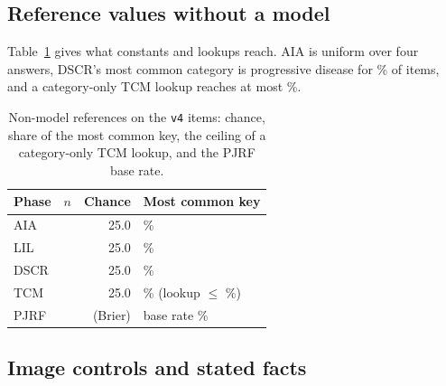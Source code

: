 \subsection{Reference values without a model}

Table~\ref{tab:baselines} gives what constants and lookups reach. AIA is uniform over four answers, DSCR's most common category is progressive disease for \vfourMajorityDSCR{}\% of items, and a category-only TCM lookup reaches at most \vfourTcmLookupConf{}\%.

\begin{table}[t]
\centering
\footnotesize
\setlength{\tabcolsep}{3pt}
\begin{tabular}{lrrl}
\toprule
Phase & $n$ & Chance & Most common key \\
\midrule
AIA & \vfourNAIA{} & 25.0 & \vfourMajorityAIA{}\% \\
LIL & \vfourNLIL{} & 25.0 & \vfourMajorityLIL{}\% \\
DSCR & \vfourNDSCR{} & 25.0 & \vfourMajorityDSCR{}\% \\
TCM & \vfourNTCM{} & 25.0 & \vfourMajorityTCM{}\% (lookup $\le$ \vfourTcmLookupConf{}\%) \\
PJRF & \vfourNPJRF{} & (Brier) & base rate \vfourPjrfBase{}\% \\
\bottomrule
\end{tabular}
\caption{Non-model references on the \texttt{v4} items: chance, share of the most common key, the ceiling of a category-only TCM lookup, and the PJRF base rate.}
\label{tab:baselines}
\end{table}

\subsection{Image controls and stated facts}

\ifnum{}
\fi

\begin{table}[t]
\centering
\footnotesize
\setlength{\tabcolsep}{3pt}

\caption{E1: accuracy (\%) with the image and with text only, with no upstream context, and the paired difference in percentage points. AIA is the positive control.}
\label{tab:e1}
\end{table}

